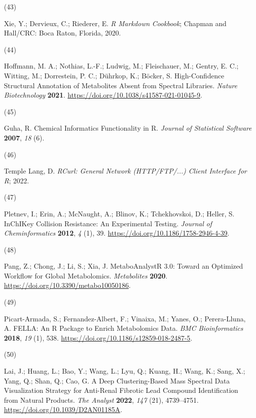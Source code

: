 \documentclass[
]{article}
\newlength{\cslhangindent}
\newlength{\csllabelwidth}
\newlength{\cslentryspacingunit} %
\newenvironment{CSLReferences}[2] %
 {%
  \setlength{\parindent}{0pt}
  \ifodd #1
  \let\oldpar\par
  \def\par{\hangindent=\cslhangindent\oldpar}
  \fi
  \setlength{\parskip}{#2\cslentryspacingunit}
 }%
 {}
\newcommand{\CSLLeftMargin}[1]{\parbox[t]{\csllabelwidth}{#1}}
\newcommand{\CSLRightInline}[1]{\parbox[t]{\linewidth - \csllabelwidth}{#1}\break}
\begin{document}
\begin{CSLReferences}{0}{0}
\leavevmode{}%
\CSLLeftMargin{(43) }%
\CSLRightInline{Xie, Y.; Dervieux, C.; Riederer, E. \emph{R Markdown
Cookbook}; {Chapman and Hall/CRC}: {Boca Raton, Florida}, 2020.}

\leavevmode{}%
\CSLLeftMargin{(44) }%
\CSLRightInline{Hoffmann, M. A.; Nothias, L.-F.; Ludwig, M.;
Fleischauer, M.; Gentry, E. C.; Witting, M.; Dorrestein, P. C.; Dührkop,
K.; Böcker, S. High-Confidence Structural Annotation of Metabolites
Absent from Spectral Libraries. \emph{Nature Biotechnology}
\textbf{2021}. \url{https://doi.org/10.1038/s41587-021-01045-9}.}

\leavevmode{}%
\CSLLeftMargin{(45) }%
\CSLRightInline{Guha, R. Chemical Informatics Functionality in {R}.
\emph{Journal of Statistical Software} \textbf{2007}, \emph{18} (6).}

\leavevmode{}%
\CSLLeftMargin{(46) }%
\CSLRightInline{Temple Lang, D. \emph{{RCurl}: {General} Network
({HTTP}/{FTP}/...) Client Interface for {R}}; 2022.}

\leavevmode{}%
\CSLLeftMargin{(47) }%
\CSLRightInline{Pletnev, I.; Erin, A.; McNaught, A.; Blinov, K.;
Tchekhovskoi, D.; Heller, S. {InChIKey} Collision Resistance: An
Experimental Testing. \emph{Journal of Cheminformatics} \textbf{2012},
\emph{4} (1), 39. \url{https://doi.org/10.1186/1758-2946-4-39}.}

\leavevmode{}%
\CSLLeftMargin{(48) }%
\CSLRightInline{Pang, Z.; Chong, J.; Li, S.; Xia, J. {MetaboAnalystR}
3.0: {Toward} an Optimized Workflow for Global Metabolomics.
\emph{Metabolites} \textbf{2020}.
\url{https://doi.org/10.3390/metabo10050186}.}

\leavevmode{}%
\CSLLeftMargin{(49) }%
\CSLRightInline{Picart-Armada, S.; Fernandez-Albert, F.; Vinaixa, M.;
Yanes, O.; Perera-Lluna, A. {FELLA}: An {R} Package to Enrich
Metabolomics Data. \emph{BMC Bioinformatics} \textbf{2018}, \emph{19}
(1), 538. \url{https://doi.org/10.1186/s12859-018-2487-5}.}

\leavevmode{}%
\CSLLeftMargin{(50) }%
\CSLRightInline{Lai, J.; Huang, L.; Bao, Y.; Wang, L.; Lyu, Q.; Kuang,
H.; Wang, K.; Sang, X.; Yang, Q.; Shan, Q.; Cao, G. A Deep
Clustering-Based Mass Spectral Data Visualization Strategy for
Anti-Renal Fibrotic Lead Compound Identification from Natural Products.
\emph{The Analyst} \textbf{2022}, \emph{147} (21), 4739--4751.
\url{https://doi.org/10.1039/D2AN01185A}.}


\end{CSLReferences}
\end{document}
